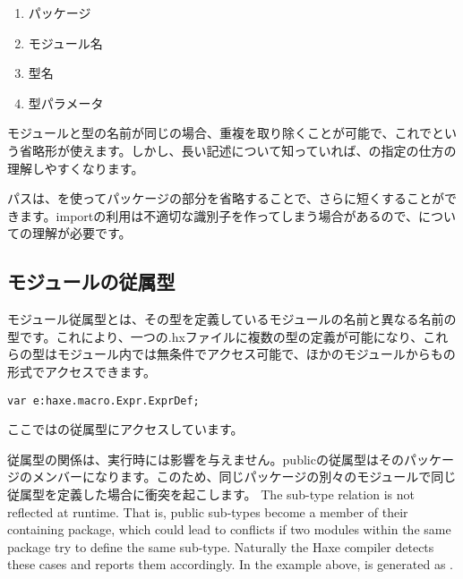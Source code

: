 \begin{enumerate}
	\item パッケージ 
	\item モジュール名 
	\item 型名 
	\item 型パラメータ 
\end{enumerate}

モジュールと型の名前が同じの場合、重複を取り除くことが可能で、これでという省略形が使えます。しかし、長い記述について知っていれば、の指定の仕方の理解しやすくなります。

パスは、を使ってパッケージの部分を省略することで、さらに短くすることができます。importの利用は不適切な識別子を作ってしまう場合があるので、についての理解が必要です。



\subsection{モジュールの従属型}
\label{type-system-module-sub-types}

モジュール従属型とは、その型を定義しているモジュールの名前と異なる名前の型です。これにより、一つの.hxファイルに複数の型の定義が可能になり、これらの型はモジュール内では無条件でアクセス可能で、ほかのモジュールからもの形式でアクセスできます。

\begin{lstlisting}
var e:haxe.macro.Expr.ExprDef;
\end{lstlisting}

ここではの従属型にアクセスしています。

従属型の関係は、実行時には影響を与えません。publicの従属型はそのパッケージのメンバーになります。このため、同じパッケージの別々のモジュールで同じ従属型を定義した場合に衝突を起こします。
The sub-type relation is not reflected at runtime. That is, public sub-types become a member of their containing package, which could lead to conflicts if two modules within the same package try to define the same sub-type. Naturally the Haxe compiler detects these cases and reports them accordingly. In the example above,  is generated as .

